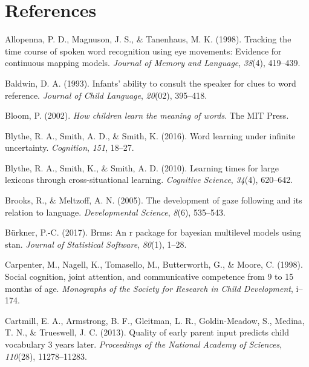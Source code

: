 \documentclass[man,floatsintext]{apa6}
\begin{document}
\section{References}\label{references}

\begingroup
\setlength{\parindent}{-0.5in} \setlength{\leftskip}{0.5in}

\hypertarget{refs}{}
\hypertarget{ref-allopenna1998tracking}{}
Allopenna, P. D., Magnuson, J. S., \& Tanenhaus, M. K. (1998). Tracking
the time course of spoken word recognition using eye movements: Evidence
for continuous mapping models. \emph{Journal of Memory and Language},
\emph{38}(4), 419--439.

\hypertarget{ref-baldwin1993infants}{}
Baldwin, D. A. (1993). Infants' ability to consult the speaker for clues
to word reference. \emph{Journal of Child Language}, \emph{20}(02),
395--418.

\hypertarget{ref-bloom2002children}{}
Bloom, P. (2002). \emph{How children learn the meaning of words}. The
MIT Press.

\hypertarget{ref-blythe2016word}{}
Blythe, R. A., Smith, A. D., \& Smith, K. (2016). Word learning under
infinite uncertainty. \emph{Cognition}, \emph{151}, 18--27.

\hypertarget{ref-blythe2010learning}{}
Blythe, R. A., Smith, K., \& Smith, A. D. (2010). Learning times for
large lexicons through cross-situational learning. \emph{Cognitive
Science}, \emph{34}(4), 620--642.

\hypertarget{ref-brooks2005development}{}
Brooks, R., \& Meltzoff, A. N. (2005). The development of gaze following
and its relation to language. \emph{Developmental Science}, \emph{8}(6),
535--543.

\hypertarget{ref-burkner2017brms}{}
Bürkner, P.-C. (2017). Brms: An r package for bayesian multilevel models
using stan. \emph{Journal of Statistical Software}, \emph{80}(1), 1--28.

\hypertarget{ref-carpenter1998social}{}
Carpenter, M., Nagell, K., Tomasello, M., Butterworth, G., \& Moore, C.
(1998). Social cognition, joint attention, and communicative competence
from 9 to 15 months of age. \emph{Monographs of the Society for Research
in Child Development}, i--174.

\hypertarget{ref-cartmill2013quality}{}
Cartmill, E. A., Armstrong, B. F., Gleitman, L. R., Goldin-Meadow, S.,
Medina, T. N., \& Trueswell, J. C. (2013). Quality of early parent input
predicts child vocabulary 3 years later. \emph{Proceedings of the
National Academy of Sciences}, \emph{110}(28), 11278--11283.
\end{document}
